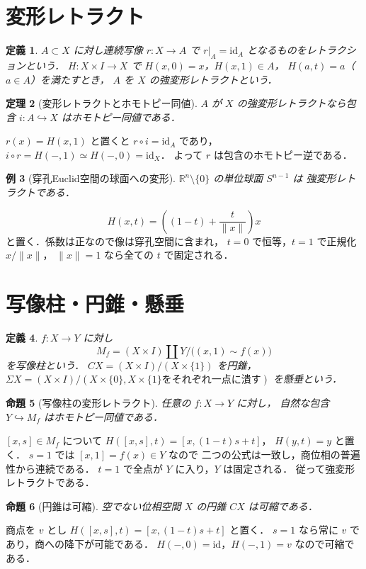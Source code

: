 \documentclass[a5paper,10pt,onecolumn]{jsarticle}
\makeatletter
\theoremstyle{mathnotetheorem}
\newtheorem{theorem}{定理}[section]
\newtheorem{definition}[theorem]{定義}
\newtheorem{proposition}[theorem]{命題}
\newtheorem{example}[theorem]{例}
\renewcommand{\proofname}{証明}
\renewenvironment{proof}[1][\proofname]{%
  \par\pushQED{\qed}\normalfont\topsep4\p@\@plus2\p@\relax
  \trivlist\item[\hskip\labelsep\bfseries #1]\ignorespaces
}{\popQED\endtrivlist\@endpefalse}
\newcommand{\norm}[1]{\lVert #1\rVert}
\makeatother
\begin{document}
\section{変形レトラクト}
\begin{definition}
$A\subset X$ に対し連続写像 $r:X\to A$ で
$r|_A=\mathrm{id}_A$ となるものをレトラクションという．
$H:X\times I\to X$ で
$H(x,0)=x$，$H(x,1)\in A$，
$H(a,t)=a$（$a\in A$）を満たすとき，
$A$ を $X$ の強変形レトラクトという．
\end{definition}
\begin{theorem}[変形レトラクトとホモトピー同値]
$A$ が $X$ の強変形レトラクトなら包含
$i:A\hookrightarrow X$ はホモトピー同値である．
\end{theorem}
\begin{proof}
$r(x)=H(x,1)$ と置くと $r\circ i=\mathrm{id}_A$ であり，
$i\circ r=H(-,1)\simeq H(-,0)=\mathrm{id}_X$．
よって $r$ は包含のホモトピー逆である．
\end{proof}
\begin{example}[穿孔Euclid空間の球面への変形]
$\mathbb R^n\setminus\{0\}$ の単位球面 $S^{n-1}$ は
強変形レトラクトである．
\end{example}
\begin{proof}
\[
 H(x,t)=\left((1-t)+\frac{t}{\norm x}\right)x
\]
と置く．係数は正なので像は穿孔空間に含まれ，
$t=0$ で恒等，$t=1$ で正規化 $x/\norm x$，
$\norm x=1$ なら全ての $t$ で固定される．
\end{proof}
\section{写像柱・円錐・懸垂}
\begin{definition}
$f:X\to Y$ に対し
\[
 M_f=(X\times I)\amalg Y\big/\bigl((x,1)\sim f(x)\bigr)
\]
を写像柱という．
$CX=(X\times I)/(X\times\{1\})$ を円錐，
$\Sigma X=(X\times I)/
 (X\times\{0\},X\times\{1\}\text{をそれぞれ一点に潰す})$
を懸垂という．
\end{definition}
\begin{proposition}[写像柱の変形レトラクト]\label{prop:cylinder}
任意の $f:X\to Y$ に対し，
自然な包含 $Y\hookrightarrow M_f$ はホモトピー同値である．
\end{proposition}
\begin{proof}
$[x,s]\in M_f$ について
$H([x,s],t)=[x,(1-t)s+t]$，
$H(y,t)=y$ と置く．
$s=1$ では $[x,1]=f(x)\in Y$ なので
二つの公式は一致し，商位相の普遍性から連続である．
$t=1$ で全点が $Y$ に入り，$Y$ は固定される．
従って強変形レトラクトである．
\end{proof}
\begin{proposition}[円錐は可縮]
空でない位相空間 $X$ の円錐 $CX$ は可縮である．
\end{proposition}
\begin{proof}
商点を $v$ とし
$H([x,s],t)=[x,(1-t)s+t]$ と置く．
$s=1$ なら常に $v$ であり，商への降下が可能である．
$H(-,0)=\mathrm{id}$，$H(-,1)=v$ なので可縮である．
\end{proof}
\end{document}
